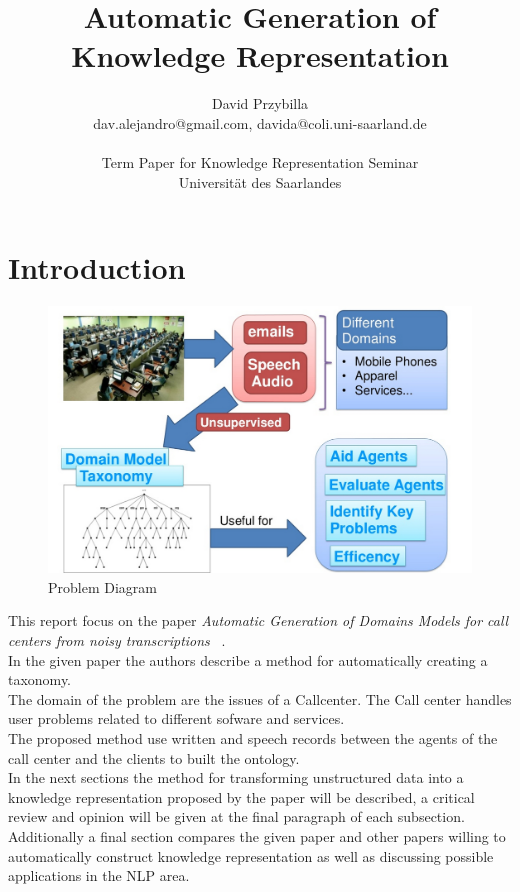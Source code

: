 \documentclass[4pt,a4paper,twocolumn]{article}
\author{David Przybilla\\dav.alejandro@gmail.com, davida@coli.uni-saarland.de\\ \\ Term Paper for Knowledge Representation Seminar\\ Universit\"{a}t des Saarlandes}
\title{Automatic Generation of Knowledge Representation}
\begin{document}
\twocolumn[
	 \begin{@twocolumnfalse}
    \maketitle
  \end{@twocolumnfalse}
 ]




\section{Introduction}


\begin{figure}[]
  \centering
    \includegraphics[scale=0.2]{pics/problem.jpg}
    \caption{Problem Diagram}
   \label{fig:problem}  
\end{figure}



This report focus on the paper \textit{Automatic Generation of Domains Models for call centers from noisy transcriptions} ~\cite{Roy:2006:AGD:1220175.1220268}.\\
In the given paper the authors describe a method for automatically creating a taxonomy.\\
The domain of the problem are the issues of a Callcenter. The Call center handles user problems related to different sofware and services.\\
The proposed method use  written and speech records between the agents of the call center and the clients to built the ontology. \\
In the next sections  the method for transforming unstructured data into a knowledge representation proposed by the paper will be described, a critical review and opinion will be given at the final paragraph of each subsection. Additionally a final section compares the given paper and other papers willing to automatically construct knowledge representation as well as discussing possible applications in the NLP area.
\end{document}
